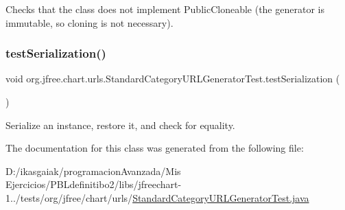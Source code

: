Checks that the class does not implement Public\+Cloneable (the generator is immutable, so cloning is not necessary). \mbox{\label{classorg_1_1jfree_1_1chart_1_1urls_1_1_standard_category_u_r_l_generator_test_a0b5249843e0f88af7cc4c06e9a070829}} 
\subsubsection{\texorpdfstring{test\+Serialization()}{testSerialization()}}
{\footnotesize\ttfamily void org.\+jfree.\+chart.\+urls.\+Standard\+Category\+U\+R\+L\+Generator\+Test.\+test\+Serialization (\begin{DoxyParamCaption}{ }\end{DoxyParamCaption})}

Serialize an instance, restore it, and check for equality. 

The documentation for this class was generated from the following file\+:\begin{DoxyCompactItemize}
\item 
D\+:/ikasgaiak/programacion\+Avanzada/\+Mis Ejercicios/\+P\+B\+Ldefinitibo2/libs/jfreechart-\/1../tests/org/jfree/chart/urls/\mbox{\hyperlink{_standard_category_u_r_l_generator_test_8java}{Standard\+Category\+U\+R\+L\+Generator\+Test.\+java}}\end{DoxyCompactItemize}
